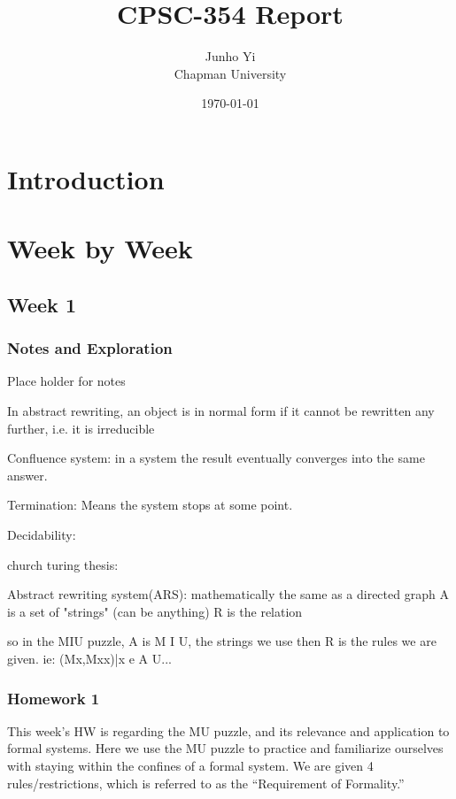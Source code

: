 \documentclass{article}
\title{CPSC-354 Report}
\author{Junho Yi  \\ Chapman University}
\date{\today}
\theoremstyle{theorem}
\theoremstyle{definition}
\theoremstyle{remark}
\begin{document}
\maketitle

\begin{abstract}
\end{abstract}

\setcounter{tocdepth}{3}
\tableofcontents

\section{Introduction}\label{intro}

\section{Week by Week}\label{homework}

\subsection{Week 1}

\subsubsection{Notes and Exploration}

Place holder for notes


In abstract rewriting, an object is in normal form if it cannot be rewritten any further, i.e. it is irreducible

Confluence system: in a system the result eventually converges into the same answer.

Termination: Means the system stops at some point. 

Decidability: 

church turing thesis:

Abstract rewriting system(ARS): mathematically the same as a directed graph
A is a set of "strings" (can be anything)
R is the relation

so in the MIU puzzle, A is M I U, the strings we use
then R is the rules we are given. ie: {(Mx,Mxx)|x e A} U...

\subsubsection{Homework 1}

This week's HW is regarding the MU puzzle, and its relevance and application to formal systems. Here we use the MU puzzle to practice and familiarize ourselves with staying within the confines of a formal system. We are given 4 rules/restrictions, which is referred to as the ``Requirement of Formality.'' 
\end{document}
